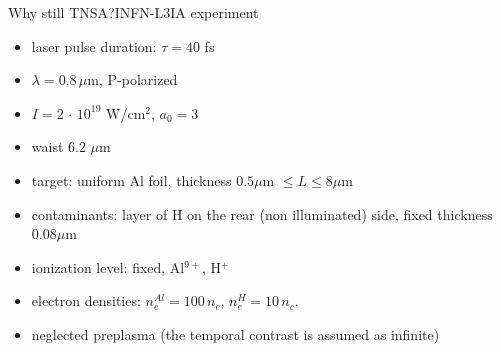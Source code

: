\documentclass[final]{beamer}
\begin{document}
\begin{frame}{Why still TNSA?}{INFN-L3IA experiment}

\begin{itemize}
  \item laser pulse duration: $\tau=40$ fs
  \item $\lambda=0.8 \,\mu$m, P-polarized
  \item $I=2\,\cdot\,10^{19} $ W/cm$^2$, $a_0=3$
  \item waist 6.2 $\mu$m
  \item target: uniform Al foil, thickness $0.5 \mu$m $\leq L \leq 8 \mu$m
  \item contaminants: layer of H on the rear (non illuminated) side, fixed thickness $0.08 \mu$m
  \item ionization level: fixed, Al$^{9+}$, H$^{+}$
  \item electron densities: $n_e^{Al}=100 \,n_c$, $n_e^H=10\,n_c$. 
  \item neglected preplasma (the temporal contrast is assumed as infinite)
\end{itemize}

\end{frame}
\end{document}
